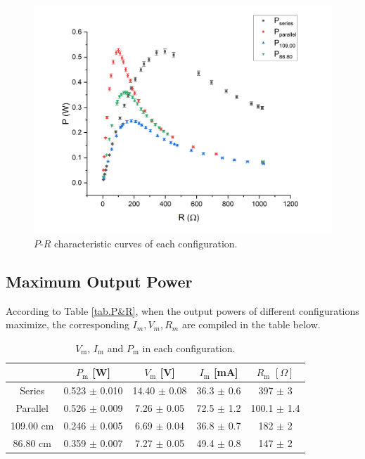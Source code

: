 \documentclass{article}
\begin{document}
{\begin{figure}[H]
\centering
\includegraphics[scale=0.5]{P-R plot}\caption{$P$-$R$ characteristic curves of each configuration.}\label{fig.P-R}
\end{figure}

\subsection{Maximum Output Power}
According to Table \ref{tab.P&R}, when the output powers of different configurations maximize, the corresponding $I_m, V_m, R_m$ are compiled in the table below. 

\begin{table}[H]\centering
    \begin{tabular}{ccccc}
        \toprule
                 & $P_\text{m}$ [W] & $V_\text{m}$ [V] & $I_\text{m}$ [mA]   & $R_\text{m}\,\,[\Omega]$ \\
        \midrule
        Series   & 0.523 $\pm$ 0.010 & 14.40 $\pm$ 0.08    & 36.3  $\pm$ 0.6 & 397   $\pm$ 3            \\
        Parallel & 0.526  $\pm$ 0.009 & 7.26 $\pm$ 0.05    & 72.5  $\pm$ 1.2 & 100.1 $\pm$ 1.4          \\
        109.00 cm &  0.246 $\pm$ 0.005 & 6.69 $\pm$ 0.04    & 36.8  $\pm$ 0.7 & 182   $\pm$ 2            \\
        86.80 cm & 0.359  $\pm$ 0.007 & 7.27 $\pm$ 0.05    & 49.4  $\pm$ 0.8 & 147   $\pm$ 2            \\
        \bottomrule
    \end{tabular}
    \caption{$V_\text{m}$, $I_\text{m}$ and $P_\text{m}$ in each configuration.}\label{tab.Pmax}
\end{table}

}
\end{document}
